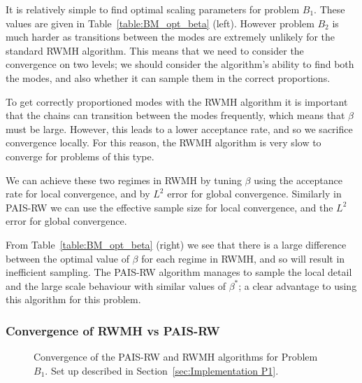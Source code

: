 \documentclass[final]{siamltex}
\begin{document}
It is relatively simple to find optimal scaling parameters for problem $B_1$.
These values are given in Table~\ref{table:BM_opt_beta} (left). However
problem $B_2$ is much harder as transitions between the modes are extremely
unlikely for the standard RWMH algorithm. This means that we need to consider the
convergence on two levels; we should consider the algorithm's ability
to find both the modes, and also whether it can sample them in the correct proportions.

To get correctly proportioned modes with the RWMH algorithm it is
important that the chains can transition between the modes frequently, which
means that $\beta$ must be large. However, this leads to a lower
acceptance rate, and so we sacrifice convergence locally. For this reason, the RWMH algorithm is very slow to
converge for problems of this type.

We can achieve these two regimes in RWMH by tuning $\beta$ using the acceptance rate for local convergence, and by $L^2$ error for global convergence. Similarly in PAIS-RW we can use the effective sample size for local convergence, and the $L^2$ error for global convergence.

From Table~\ref{table:BM_opt_beta} (right) we see that there is a large difference between the optimal value of $\beta$ for each regime in RWMH, and so will result in inefficient sampling. The PAIS-RW algorithm manages to sample the local detail and the large scale behaviour with similar values of $\beta^*$; a clear advantage to using this algorithm for this problem.

\subsubsection{Convergence of RWMH vs PAIS-RW}


\begin{figure}[htb]
\centering
{}
\caption{Convergence of the PAIS-RW and RWMH algorithms for Problem $B_1$. Set up described in Section~\ref{sec:Implementation P1}.}
\label{fig:BM1_L2}
\end{figure}
\end{document}
